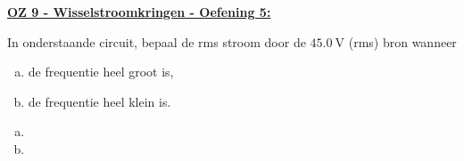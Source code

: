 \textbf{\underline{OZ 9 - Wisselstroomkringen - Oefening 5:}}
\vspace{0.5cm}

In onderstaande circuit, bepaal de rms stroom door de $45.0 \ \text{V}$ (rms) bron wanneer

\begin{enumerate}[(a)]
    \item de frequentie heel groot is,
    \item de frequentie heel klein is.
\end{enumerate}

\begin{enumerate}[(a)]
    \item
        \begin{description}[labelwidth=1.5cm, leftmargin=!]
            \item[Geg. :]   
            \item[Gevr. :] 
            \item[Opl. :]   
        \end{description}
    \item 
        \begin{description}[labelwidth=1.5cm, leftmargin=!]
            \item[Geg. :]   
            \item[Gevr. :] 
            \item[Opl. :]   
        \end{description}
\end{enumerate}

\vspace{1cm}